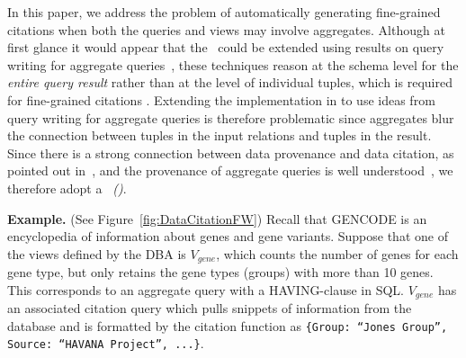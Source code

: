 In this paper, we address the problem of automatically generating fine-grained citations when both the queries and views may involve aggregates.    Although at first glance it would appear that the \rba\ could be extended using results on query writing for aggregate queries~\cite{zaharioudakis2000answering, srivastava1996answering, galindo2001orthogonal,cohen2006rewriting,cohen2006user}, these techniques reason at the schema level for the \textit{entire query result} rather than at the level of individual tuples, which is required for fine-grained citations .  Extending the implementation in \cite{wu2018data} to use ideas from query writing for aggregate queries is therefore problematic since aggregates blur the connection between tuples in the input relations and tuples in the result.  Since there is a strong connection between data provenance and data citation, as pointed out in~\cite{alawini2018data}, and the provenance of aggregate queries is well understood~\cite{amsterdamer2011provenance}, we therefore adopt a \textit{\pbafull\ (\pba)}.


\textbf{Example.} (See Figure~\ref{fig:DataCitationFW})  Recall that GENCODE is an encyclopedia of information about genes and gene variants.  Suppose that one of the views defined by the DBA  is $V_{gene}$, which counts the number of genes for each gene type, but only retains the gene types (groups) with more than 10 genes.  This corresponds to an aggregate query with a HA\-VING-clause in SQL.  $V_{gene}$ has an associated citation query which pulls snippets of information from the database and is formatted by the citation function as 
{\tt \{Group: ``Jones Group'', Source: ``HAVANA Project'', ...\}}.


